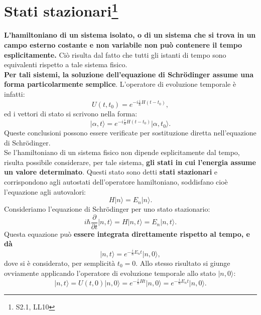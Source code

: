 \section[Stati stazionari]{Stati stazionari\footnote{S2.1, LL10}}
\textbf{L'hamiltoniano di un sistema isolato, o di un sistema che si trova in un campo esterno costante e non variabile non può contenere il tempo esplicitamente.} Ciò risulta dal fatto che tutti gli istanti di tempo sono equivalenti rispetto a tale sistema fisico.\\
\textbf{Per tali sistemi, la soluzione dell'equazione di Schr\"{o}dinger assume una forma particolarmente semplice}. L'operatore di evoluzione temporale è infatti:
\begin{equation}
U(t,t_0)= e^{-i\frac{i}{\hbar}H(t-t_0)},
\end{equation}
ed i vettori di stato si scrivono nella forma:
\begin{equation}
\vert \alpha, t \rangle = e^{-i\frac{i}{\hbar}H(t-t_0)}\vert \alpha, t_0 \rangle.
\end{equation}
Queste conclusioni possono essere verificate per sostituzione diretta nell'equazione di Schr\"{o}dinger.\\
Se l'hamiltoniano di un sistema fisico non dipende esplicitamente dal tempo, risulta possibile considerare, per tale sistema, \textbf{gli stati in cui l'energia assume un valore determinato}. Questi stato sono detti \textbf{stati stazionari} e corrispondono agli autostati dell'operatore hamiltoniano, soddisfano cioè l'equazione agli autovalori:
\begin{equation}
H|n\rangle = E_n |n \rangle.
\end{equation}
Consideriamo l'equazione di Schr\"{o}dinger per uno stato stazionario:
\begin{equation}
i\hbar \frac{\partial}{\partial t}|n,t\rangle = H |n,t \rangle = E_n |n, t \rangle.
\end{equation}
Questa equazione può \textbf{essere integrata direttamente rispetto al tempo, e dà}
\begin{equation}
|n,t\rangle = e^{-\frac{i}{\hbar}E_n t}\vert n, 0\rangle,
\label{eq:cap8_4}
\end{equation}
dove si è considerato, per semplicità $t_0=0$. Allo stesso risultato si giunge ovviamente applicando l'operatore di evoluzione temporale allo stato $\vert n, 0\rangle$:
\begin{equation}
\vert n, t \rangle = U(t,0) \vert n, 0 \rangle = e^{-\frac{i}{\hbar}H t}\vert n, 0\rangle= e^{-\frac{i}{\hbar}E_n t}\vert n, 0\rangle.
\end{equation}
